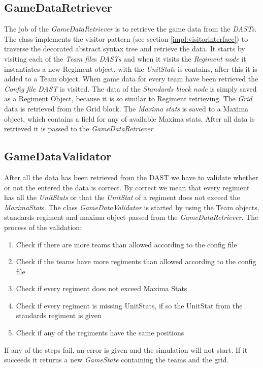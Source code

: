 \subsection{GameDataRetriever}
	The job of the {\it GameDataRetriever} is to retrieve the game data from the {\it DASTs}. The class implements the visitor pattern
	(see section \ref{impl:visitorinterface}) to traverse the decorated abstract syntax tree and retrieve the data. 
	It starts by visiting each of the {\it Team file}s {\it DASTs} and when it visits the {\it Regiment node} it instantiates a new Regiment object, 
	with the {\it UnitStat}s is contains, after this it is added to a Team object. When game data for every team have been retrieved the {\it Config file}
	{\it DAST} is visited. The data of the {\it Standards block node} is simply saved as a Regiment Object, because it is so similar to Regiment retrieving. 
	The {\it Grid} data is retrieved from the Grid block. The {\it Maxima stats} is saved to a Maxima object, which contains a field for any of available 
	Maxima stats. After all data is retrieved it is passed to the {\it GameDataRetriever}

\subsection{GameDataValidator}\label{sec:gdv}
	After all the data has been retrieved from the DAST we have to validate whether or not the entered the data is correct. 
	By correct we mean that every regiment has all the {\it UnitStats} or that the {\it UnitStat} 
	of a regiment does not exceed the {\it MaximaStat}s. 
	The class {\it GameDataValidator} is started by using the Team objects, standards regiment and maxima object passed from the {\it GameDataRetriever}.
	The process of the validation: \\
	\begin{enumerate}
		\item Check if there are more teams than allowed according to the config file
		\item Check if the teams have more regiments than allowed according to the config file
		\item Check if every regiment does not exceed Maxima Stats
		\item Check if every regiment is missing UnitStats, if so the UnitStat from the standards regiment is given
		\item Check if any of the regiments have the same positions
	\end{enumerate}
	If any of the steps fail, an error is given and the simulation will not start. If it succeeds it returns a new {\it GameState} containing the teams 
	and the grid.
	
